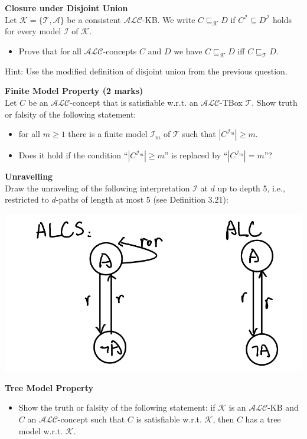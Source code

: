 \documentclass[12pt,a4paper]{article}
\newenvironment{problem}[2][{\color{red}Question}]{\begin{trivlist}
\item[\hskip \labelsep {\bfseries #1}\hskip \labelsep {\bfseries #2.}]}{\end{trivlist}}
\begin{document}
\begin{problem}{{\color{red}5}}
\textbf{Closure under Disjoint Union}\\
Let $\mathcal{K}=\{\mathcal{T}, \mathcal{A}\}$ be a consistent $\mathcal{ALC}$-KB. We write $C\sqsubseteq_{\mathcal{K}}D$ if $C^{\mathcal{I}}\subseteq D^{\mathcal{I}}$ holds for every model $\mathcal{I}$ of $\mathcal{K}$.
\begin{itemize}
    \item Prove that for all $\mathcal{ALC}$-concepts $C$ and $D$ we have $C\sqsubseteq_{\mathcal{K}}D$ iff $C\sqsubseteq_{\mathcal{T}}D$.
\end{itemize}
Hint: Use the modified definition of disjoint union from the previous question.
\end{problem}


\begin{problem}{{\color{red}6}}
\textbf{Finite Model Property (2 marks)}\\
Let $C$ be an $\mathcal{ALC}$-concept that is satisfiable w.r.t. an $\mathcal{ALC}$-TBox $\mathcal{T}$. Show truth or falsity of the following statement: 
\begin{itemize}
    \item for all $m\geq 1$ there is a finite model $\mathcal{I}_{m}$ of $\mathcal{T}$ such that $|C^{\mathcal{I}_{m}}|\geq m$.
    \item Does it hold if the condition ``$|C^{\mathcal{I}_{m}}|\geq m$'' is replaced by ``$|C^{\mathcal{I}_{m}}|=m$''?
\end{itemize}
\end{problem}


\begin{problem}{{\color{red}7}}
\textbf{Unravelling}\\
Draw the unraveling of the following interpretation $\mathcal{I}$ at $d$ up to depth 5, i.e., restricted to $d$-paths of length at most 5 (see Definition 3.21):
\begin{center}
    \includegraphics[width=0.22\columnwidth]{4.png}
    \end{center}
\end{problem}


\begin{problem}{{\color{red}8}}
\textbf{Tree Model Property}
\begin{itemize}
    \item Show the truth or falsity of the following statement: if $\mathcal{K}$ is an $\mathcal{ALC}$-KB and $C$ an $\mathcal{ALC}$-concept such that $C$ is satisfiable w.r.t. $\mathcal{K}$, then $C$ has a tree model w.r.t. $\mathcal{K}$.
\end{itemize}
\end{problem}
\end{document}
